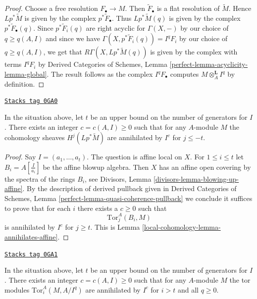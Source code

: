 \begin{proof}
Choose a free resolution $F_\bullet \to M$. Then $\widetilde{F}_\bullet$
is a flat resolution of $\widetilde{M}$. Hence $Lp^*\widetilde{M}$
is given by the complex $p^*\widetilde{F}_\bullet$. Thus
$Lp^*\widetilde{M}(q)$ is given by the complex $p^*\widetilde{F}_\bullet(q)$.
Since $p^*\widetilde{F}_i(q)$ are right acyclic for $\Gamma(X, -)$ by
our choice of $q \geq q(A, I)$ and since we have
$\Gamma(X, p^*\widetilde{F}_i(q)) = I^qF_i$ by our choice of $q \geq q(A, I)$,
we get that $R\Gamma(X, Lp^*\widetilde{M}(q))$ is given by the complex
with terms $I^qF_i$ by Derived Categories of Schemes, Lemma
\ref{perfect-lemma-acyclicity-lemma-global}.
The result follows as the complex $I^qF_\bullet$ computes
$M \otimes_A^\mathbf{L} I^q$ by definition.
\end{proof}

\begin{lemma}[Annihilates]
\label{local-cohomology-lemma-annihilates}
\href{https://stacks.math.columbia.edu/tag/0GA0}{\texttt{Stacks tag 0GA0}}

In the situation above, let $t$ be an upper bound on the number of
generators for $I$. There exists an integer $c = c(A, I) \geq 0$
such that for any $A$-module $M$ the cohomology sheaves
$H^j(Lp^*\widetilde{M})$ are annihilated by $I^c$ for $j \leq -t$.
\end{lemma}

\begin{proof}
Say $I = (a_1, \ldots, a_t)$. The question is affine local on $X$.
For $1 \leq i \leq t$ let $B_i = A[\frac{I}{a_i}]$ be the affine
blowup algebra. Then $X$ has an affine open covering by
the spectra of the rings $B_i$, see
Divisors, Lemma \ref{divisors-lemma-blowing-up-affine}.
By the description of derived pullback given in
Derived Categories of Schemes, Lemma
\ref{perfect-lemma-quasi-coherence-pullback}
we conclude it suffices to prove that for each $i$ there exists a $c \geq 0$
such that
$$
\text{Tor}_j^A(B_i, M)
$$
is annihilated by $I^c$ for $j \geq t$. This is
Lemma \ref{local-cohomology-lemma-annihilates-affine}.
\end{proof}

\begin{lemma}
\label{local-cohomology-lemma-annihilates-tors}
\href{https://stacks.math.columbia.edu/tag/0GA1}{\texttt{Stacks tag 0GA1}}

In the situation above, let $t$ be an upper bound on the number of
generators for $I$. There exists an integer $c = c(A, I) \geq 0$
such that for any $A$-module $M$ the tor modules
$\text{Tor}_i^A(M, A/I^q)$ are annihilated by $I^c$ for $i > t$
and all $q \geq 0$.
\end{lemma}

